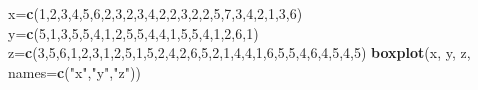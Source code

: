 \documentclass[
]{book}
\newenvironment{Shaded}{\begin{snugshade}}{\end{snugshade}}
\newcommand{\DataTypeTok}[1]{\textcolor[rgb]{0.13,0.29,0.53}{#1}}
\newcommand{\DecValTok}[1]{\textcolor[rgb]{0.00,0.00,0.81}{#1}}
\newcommand{\KeywordTok}[1]{\textcolor[rgb]{0.13,0.29,0.53}{\textbf{#1}}}
\newcommand{\NormalTok}[1]{#1}
\newcommand{\StringTok}[1]{\textcolor[rgb]{0.31,0.60,0.02}{#1}}
\theoremstyle{definition}
\theoremstyle{definition}
\theoremstyle{definition}
\theoremstyle{remark}
\begin{document}
\begin{Shaded}
\begin{Highlighting}[]
\NormalTok{x=}\KeywordTok{c}\NormalTok{(}\DecValTok{1}\NormalTok{,}\DecValTok{2}\NormalTok{,}\DecValTok{3}\NormalTok{,}\DecValTok{4}\NormalTok{,}\DecValTok{5}\NormalTok{,}\DecValTok{6}\NormalTok{,}\DecValTok{2}\NormalTok{,}\DecValTok{3}\NormalTok{,}\DecValTok{2}\NormalTok{,}\DecValTok{3}\NormalTok{,}\DecValTok{4}\NormalTok{,}\DecValTok{2}\NormalTok{,}\DecValTok{2}\NormalTok{,}\DecValTok{3}\NormalTok{,}\DecValTok{2}\NormalTok{,}\DecValTok{2}\NormalTok{,}\DecValTok{5}\NormalTok{,}\DecValTok{7}\NormalTok{,}\DecValTok{3}\NormalTok{,}\DecValTok{4}\NormalTok{,}\DecValTok{2}\NormalTok{,}\DecValTok{1}\NormalTok{,}\DecValTok{3}\NormalTok{,}\DecValTok{6}\NormalTok{)}
\NormalTok{y=}\KeywordTok{c}\NormalTok{(}\DecValTok{5}\NormalTok{,}\DecValTok{1}\NormalTok{,}\DecValTok{3}\NormalTok{,}\DecValTok{5}\NormalTok{,}\DecValTok{5}\NormalTok{,}\DecValTok{4}\NormalTok{,}\DecValTok{1}\NormalTok{,}\DecValTok{2}\NormalTok{,}\DecValTok{5}\NormalTok{,}\DecValTok{5}\NormalTok{,}\DecValTok{4}\NormalTok{,}\DecValTok{4}\NormalTok{,}\DecValTok{1}\NormalTok{,}\DecValTok{5}\NormalTok{,}\DecValTok{5}\NormalTok{,}\DecValTok{4}\NormalTok{,}\DecValTok{1}\NormalTok{,}\DecValTok{2}\NormalTok{,}\DecValTok{6}\NormalTok{,}\DecValTok{1}\NormalTok{)}
\NormalTok{z=}\KeywordTok{c}\NormalTok{(}\DecValTok{3}\NormalTok{,}\DecValTok{5}\NormalTok{,}\DecValTok{6}\NormalTok{,}\DecValTok{1}\NormalTok{,}\DecValTok{2}\NormalTok{,}\DecValTok{3}\NormalTok{,}\DecValTok{1}\NormalTok{,}\DecValTok{2}\NormalTok{,}\DecValTok{5}\NormalTok{,}\DecValTok{1}\NormalTok{,}\DecValTok{5}\NormalTok{,}\DecValTok{2}\NormalTok{,}\DecValTok{4}\NormalTok{,}\DecValTok{2}\NormalTok{,}\DecValTok{6}\NormalTok{,}\DecValTok{5}\NormalTok{,}\DecValTok{2}\NormalTok{,}\DecValTok{1}\NormalTok{,}\DecValTok{4}\NormalTok{,}\DecValTok{4}\NormalTok{,}\DecValTok{1}\NormalTok{,}\DecValTok{6}\NormalTok{,}\DecValTok{5}\NormalTok{,}\DecValTok{5}\NormalTok{,}\DecValTok{4}\NormalTok{,}\DecValTok{6}\NormalTok{,}\DecValTok{4}\NormalTok{,}\DecValTok{5}\NormalTok{,}\DecValTok{4}\NormalTok{,}\DecValTok{5}\NormalTok{)}
\KeywordTok{boxplot}\NormalTok{(x, y, z, }\DataTypeTok{names=}\KeywordTok{c}\NormalTok{(}\StringTok{"x"}\NormalTok{,}\StringTok{"y"}\NormalTok{,}\StringTok{"z"}\NormalTok{))}
\end{Highlighting}
\end{Shaded}
\end{document}

